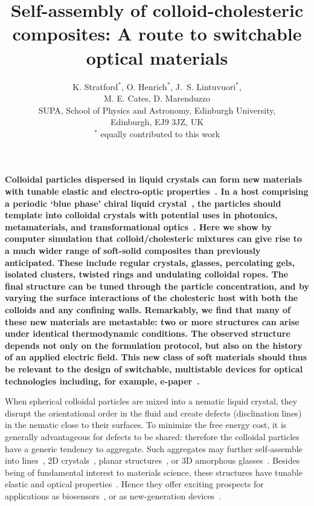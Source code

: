 \documentclass[12pt]{article}
\begin{document}
\title{Self-assembly of colloid-cholesteric composites: A route to switchable optical materials}
\author{K. Stratford$^{*}$, O. Henrich$^{*}$, J.~S. Lintuvuori$^{*}$,\\
M. E. Cates, D. Marenduzzo \\ 
{\small SUPA, School of Physics and Astronomy, Edinburgh University,} \\
\small{Edinburgh, EJ9 3JZ, UK}\\
\small{$^{*}$ equally contributed to this work}}
\date{}

\maketitle

{\bf Colloidal particles dispersed in liquid crystals can form new materials with tunable elastic and electro-optic properties~\cite{stark}. In a host comprising  a periodic `blue phase' chiral liquid crystal~\cite{mermin}, the particles should template into colloidal crystals \cite{miha} with potential uses in photonics, metamaterials, and transformational optics~\cite{lavrentovich}. 
Here we show by computer simulation that colloid/cholesteric mixtures can give rise to a much wider range of soft-solid composites than previously anticipated. These include regular crystals, glasses, percolating gels, isolated clusters, twisted rings and undulating colloidal ropes. The final structure can be tuned through the particle concentration, and by varying the surface interactions of the cholesteric host with both the colloids and any confining walls. 
Remarkably, we find that many of these new materials are metastable: two or more structures can arise under identical thermodynamic conditions. The observed structure depends not only on the formulation protocol,
but also on the history of an applied electric field.  
This new class of soft materials should thus be relevant to the design of switchable, multistable devices for optical technologies including, for example, e-paper~\cite{epaper}.}

When spherical colloidal particles are mixed into a nematic liquid crystal, 
they disrupt the orientational order in the fluid and create defects (disclination lines) in the nematic close to their surfaces. To minimize the free energy cost, it is generally advantageous for defects to be shared:
therefore the colloidal particles have a generic tendency to aggregate. Such aggregates may further 
self-assemble into lines~\cite{wiresmiha}, 2D crystals~\cite{zumer}, 
planar structures~\cite{tanaka}, or 3D amorphous glasses~\cite{tiffany}.
Besides being of fundamental interest to materials science, these
structures have tunable elastic and optical properties~\cite{stark}. Hence 
they offer exciting prospects for applications as biosensors~\cite{abbott}, or
as new-generation devices~\cite{colloiddevice,tanakanatmat}.
\end{document}
